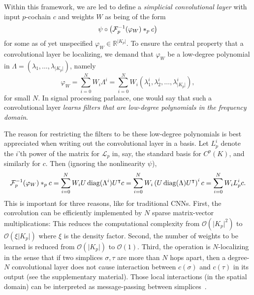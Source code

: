 Within this framework, we are led to define a \emph{simplicial convolutional layer} with input $p$-cochain $c$ and weights $W$ as being of the form
\begin{equation*}
  \psi\circ\left(\mathcal{F}^{-1}_p(\varphi_W)\ast_p c\right)
  \end{equation*}
for some as of yet unspecified $\varphi_W\in\mathbb{R}^{\lvert K_p \rvert}$. To ensure the central property that a convolutional layer be localizing, we demand that $\varphi_W$ be a low-degree polynomial in $\Lambda=(\lambda_1, \dotsc, \lambda_{\lvert K_p \rvert})$, namely
\begin{equation*}
  \varphi_W = \sum_{i=0}^N W_i\Lambda^i = \sum_{i=0}^N W_i(\lambda^i_1, \lambda^i_2, \dotsc, \lambda^i_{\lvert K_p \rvert}),
\end{equation*}
for small $N$. In signal processing parlance, one would say that such a convolutional layer \emph{learns filters that are low-degree polynomials in the frequency domain}.

The reason for restricting the filters to be these low-degree polynomials is best appreciated when writing out the convolutional layer in a basis. Let $L^i_p$ denote the $i$'th power of the matrix for $\mathcal{L}_p$ in, say, the standard basis for $C^p(K)$, and similarly for $c$. Then (ignoring the nonlinearity $\psi$), 
\begin{equation*}
  \mathcal{F}\inv_p(\varphi_W)\ast_p c = \sum_{i=0}^N W_iU\diag(\Lambda^i)U\transpose c = \sum_{i=0}^N W_i\left(U\diag(\Lambda)U\transpose\right)^i c = \sum_{i=0}^NW_iL^i_pc. %
\end{equation*}
This is important for three reasons, like for traditional CNNs.
First, the convolution can be efficiently implemented by $N$ sparse matrix-vector multiplications: This reduces the computational complexity from $\mathcal{O}(\lvert K_p\rvert^2)$ to $\mathcal{O}(\xi\lvert K_p\rvert)$ where $\xi$ is the density factor.
Second, the number of weights to be learned is reduced from $\mathcal{O}(\lvert K_p\rvert)$ to $\mathcal{O}(1)$.
Third, the operation is $N$-localizing in the sense that if two simplices $\sigma,\tau$ are more than $N$ hops apart, then a degree-$N$ convolutional layer does not cause interaction between $c(\sigma)$ and $c(\tau)$ in its output (see the supplementary material).
Those local interactions (in the spatial domain) can be interpreted as message-passing between simplices~\cite{gilmer2017NeuralMP}.

